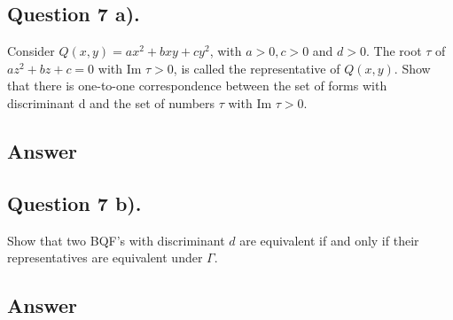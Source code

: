 \subsection{Question 7 a).}
\noindent
Consider $Q(x,y)=a x^2 + b x y +c y^2$, with $a>0, c>0$ and $d>0$. The root $\tau$ of $a z^2 + b z + c = 0$ with
Im $\tau > 0$, is called the representative of $Q(x,y)$. Show that there is one-to-one correspondence between the
set of forms with discriminant d and the set of numbers $\tau$ with Im $\tau > 0$.

\subsection*{Answer}
\noindent
[TBD]


\subsection{Question 7 b).}
\noindent
Show that two BQF's with discriminant $d$ are equivalent if and only if their representatives are equivalent under $\Gamma$.
\subsection*{Answer}
\noindent
[TBD]
